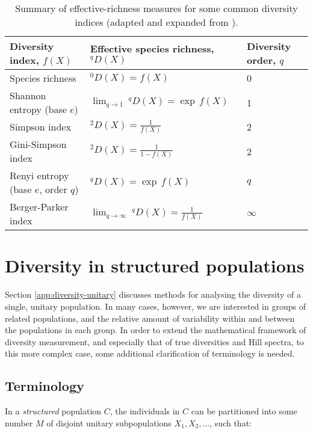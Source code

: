 \begin{table}
\centering
\caption[Summary of effective-richness measures for some common diversity indices]{Summary of effective-richness measures for some common diversity indices (adapted and expanded from \citep{jost2006entropy}).}
\begin{tabular}{lll}\toprule
Diversity index, $f(X)$ & Effective species richness,~$^qD(X)$ & Diversity order, $q$\\\midrule
Species richness & $^0D(X) = f(X)$ & 0 \\
Shannon entropy (base $e$) & $\lim_{q \to 1}~^qD(X) = \exp\,f(X)$ & 1\\
Simpson index & $^2D(X) = \frac{1}{f(X)}$ & 2\\
Gini-Simpson index & $^2D(X) = \frac{1}{1-f(X)}$ & 2\\
Renyi entropy (base $e$, order $q$) & $^qD(X) = \exp\,f(X)$ & $q$\\
Berger-Parker index & $\lim_{q \to \infty}~^qD(X) = \frac{1}{f(X)}$ & $\infty$\\
\bottomrule
\end{tabular}
\label{tab:diversity}
\end{table}

\section{Diversity in structured populations}
\label{app:diversity-structured}

Section \ref{app:diversity-unitary} discusses methods for analysing the diversity of a single, unitary population. In many cases, however, we are interested in groups of related populations, and the relative amount of variability within and between the populations in each group. In order to extend the mathematical framework of diversity measurement, and especially that of true diversities and Hill spectra, to this more complex case, some additional clarification of terminology is needed.

\subsection{Terminology}
\label{app:diversity-structured-terminology}

In a \textit{structured} population $C$, the individuals in $C$ can be partitioned into some number $M$ of disjoint unitary subpopulations $X_1, X_2, \dots$, such that:

